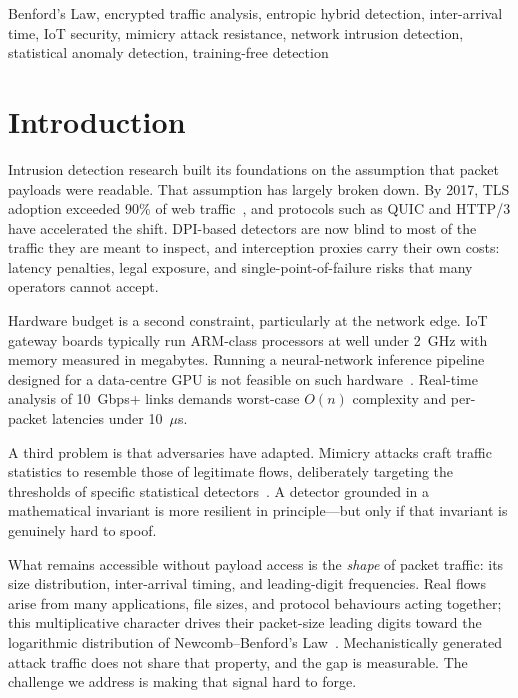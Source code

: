 \documentclass[conference]{IEEEtran}
\begin{document}
\begin{IEEEkeywords}
Benford's Law, encrypted traffic analysis, entropic hybrid detection,
inter-arrival time, IoT security, mimicry attack resistance, network
intrusion detection, statistical anomaly detection, training-free detection
\end{IEEEkeywords}

\section{Introduction}

Intrusion detection research built its foundations on the assumption that
packet payloads were readable. That assumption has largely broken down.
By 2017, TLS adoption exceeded 90\% of web traffic~\cite{b1}, and
protocols such as QUIC and HTTP/3 have accelerated the shift. DPI-based
detectors are now blind to most of the traffic they are meant to inspect,
and interception proxies carry their own costs: latency penalties, legal
exposure, and single-point-of-failure risks that many operators cannot
accept.

Hardware budget is a second constraint, particularly at the network edge.
IoT gateway boards typically run ARM-class processors at well under 2~GHz
with memory measured in megabytes. Running a neural-network inference
pipeline designed for a data-centre GPU is not feasible on such
hardware~\cite{b2}. Real-time analysis of 10~Gbps+ links demands
worst-case $O(n)$ complexity and per-packet latencies under 10~$\mu$s.

A third problem is that adversaries have adapted. Mimicry attacks craft
traffic statistics to resemble those of legitimate flows, deliberately
targeting the thresholds of specific statistical detectors~\cite{b3}.
A detector grounded in a mathematical invariant is more resilient in
principle—but only if that invariant is genuinely hard to spoof.

What remains accessible without payload access is the \textit{shape} of
packet traffic: its size distribution, inter-arrival timing, and leading-digit
frequencies. Real flows arise from many applications, file sizes, and
protocol behaviours acting together; this multiplicative character drives
their packet-size leading digits toward the logarithmic distribution of
Newcomb--Benford's Law~\cite{b4,b5}. Mechanistically generated attack
traffic does not share that property, and the gap is measurable.
The challenge we address is making that signal hard to forge.
\end{document}

